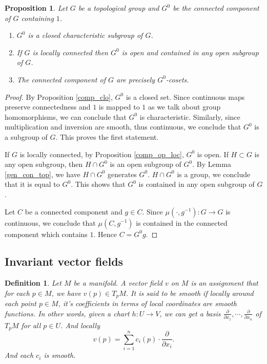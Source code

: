 \documentclass{article}
\newtheorem{proposition}{Proposition}[section]
\newtheorem{definition}{Definition}[section]
\numberwithin{equation}{section}
\begin{document}
\begin{proposition}
Let $G$ be a topological group and $G^0$ be the connected component of $G$ containing $1$. 
\begin{enumerate}[1)]
\item $G^0$ is a closed characteristic subgroup of $G$.
\item If $G$ is locally connected then $G^0$ is open and contained in any open subgroup of $G$.
\item The connected component of $G$ are precisely $G^0$-cosets.
\end{enumerate}
\end{proposition}

\begin{proof}
By Proposition \ref{comp_clo}, $G^0$ is a closed set. Since continuous maps preserve connectedness and $1$ is mapped to $1$ as we talk about group homomorphisms, we can conclude that $G^0$ is characteristic. Similarly, since multiplication and inversion are smooth, thus continuous, we conclude that $G^0$ is a subgroup of $G$. This proves the first statement.\\
\par If $G$ is locally connected, by Proposition \ref{comp_op_loc}, $G^0$ is open. If $H\subset G$ is any open subgroup, then $H\cap G^0$ is an open subgroup of $G^0$. By Lemma \ref{gen_con_top}, we have $H\cap G^0$ generates $G^0$. $H\cap G^0$ is a group, we conclude that it is equal to $G^0$. This shows that $G^0$ is contained in any open subgroup of $G$.\\
\par Let $C$ be a connected component and $g\in C$. Since $\mu(\cdot,g^{-1}):G\to G$ is continuous, we conclude that $\mu(C,g^{-1})$ is contained in the connected component which contains $1$. Hence $C=G^0g$.
\end{proof}

\subsection{Invariant vector fields}

\begin{definition}
Let $M$ be a manifold. A vector field $v$ on $M$ is an assignment that for each $p\in M$, we have $v(p)\in T_pM$. It is said to be smooth if locally around each point $p\in M$, it's coefficients in terms of local coordinates are smooth functions. In other words, given a chart $h:U\to V$, we can get a basis ${\frac \partial {\partial x_1}},\cdots,{\frac \partial {\partial x_n}}$ of $T_pM$ for all $p\in U$. And locally
\begin{equation*}
v(p) = \sum_{i=1}^n c_i(p)\cdot{\frac \partial {\partial x_i}}.
\end{equation*}
And each $c_i$ is smooth.
\end{definition}
\end{document}
